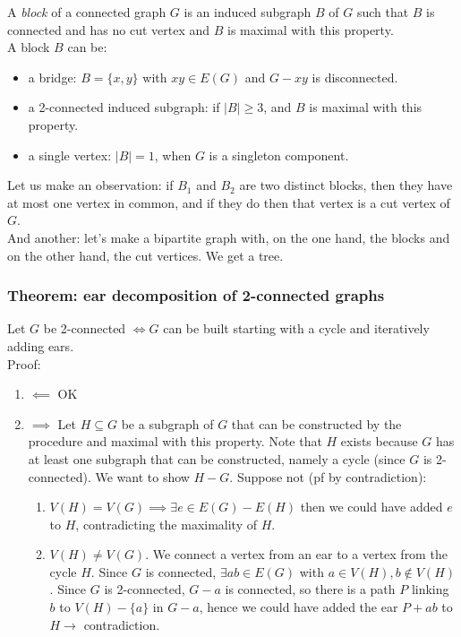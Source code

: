\documentclass[11pt]{book}
\begin{document}
		A \textit{block} of a connected graph $G$ is an induced subgraph $B$ of $G$ such that $B$ is connected and has no cut vertex and $B$ is maximal with this property.\\
		
		A block $B$ can be:
			\begin{itemize}
				\item a bridge: $B = \{x,y\}$ with $xy \in E(G)$ and $G - xy$ is disconnected.
				\item a 2-connected induced subgraph: if $|B| \geq 3$, and $B$ is maximal with this property.
				\item a single vertex: $|B| = 1$, when $G$ is a singleton component. 
			\end{itemize}
			
		Let us make an observation: if $B_1$ and $B_2$ are two distinct blocks, then they have at most one vertex in common, and if they do then that vertex is a cut vertex of $G$.\\
		
		And another: let's make a bipartite graph with, on the one hand, the blocks and on the other hand, the cut vertices. We get a tree.
		
		\subsubsection{Theorem: ear decomposition of 2-connected graphs}
		Let $G$ be 2-connected $\iff G$ can be built starting with a cycle and iteratively adding ears.\\
		
		Proof: 
		\begin{enumerate}
			\item $\impliedby$ OK
			\item $\implies$ Let $H \subseteq G$ be a subgraph of $G$ that can be constructed by the procedure and maximal with this property. Note that $H$ exists because $G$ has at least one subgraph that can be constructed, namely a cycle (since $G$ is 2-connected). We want to show $H - G$. Suppose not (pf by contradiction): 
				\begin{enumerate} 
					\item $V(H) = V(G) \implies \exists e \in E(G) - E(H)$ then we could have added $e$ to $H$, contradicting the maximality of $H$.
					\item $V(H) \neq V(G)$. We connect a vertex from an ear to a vertex from the cycle $H$. Since $G$ is connected, $\exists ab \in E(G)$ with $a \in V(H), b \notin V(H)$. Since $G$ is 2-connected, $G-a$ is connected, so there is a path $P$ linking $b$ to $V(H) - \{a\}$ in $G- a$, hence we could have added the ear $P + ab$ to $H \rightarrow$ contradiction. 
				\end{enumerate}
		\end{enumerate}
		
\end{document}
